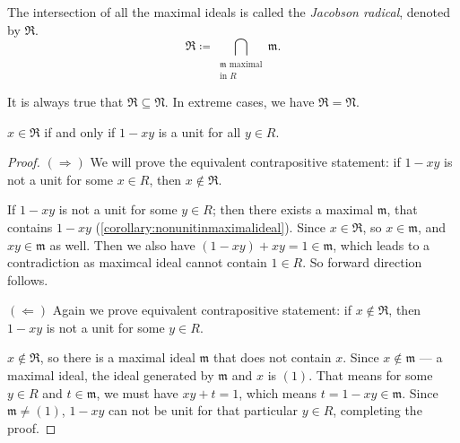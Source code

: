 \begin{definition}
    The intersection of all the maximal ideals is called the \textit{Jacobson radical}, denoted by \(\mathfrak{R}\).
    \[
        \mathfrak{R} \coloneq \bigcap_{\substack{\mathfrak{m} \text{ maximal} \\ \text{in } R}} \mathfrak{m}.
    \] 
\end{definition}
It is always true that \(\mathfrak{R} \subseteq \mathfrak{N}\). In extreme cases, we have \(\mathfrak{R} = \mathfrak{N}\).
\begin{theorem}\label{thm:characterisationOfJacobsonRad}
    \(x \in \mathfrak{R}\) if and only if \(1 - xy\) is a unit for all  \(y \in R\).
\end{theorem}
\begin{proof}
\((\Longrightarrow)\) We will prove the equivalent contrapositive statement: if \(1 - xy\) is not a unit for some  \(x \in R\), then  \(x \not\in \mathfrak{R}\).

If \(1 - xy\) is not a unit for some \(y \in R\); then there exists a maximal  \(\mathfrak{m}\), that contains \(1 - xy\) (\autoref{corollary:nonunitinmaximalideal}). Since  \(x \in \mathfrak{R}\), so \(x \in \mathfrak{m}\), and \(xy \in \mathfrak{m}\) as well. Then we also have \((1-xy)+xy  = 1\in \mathfrak{m}\), which leads to a contradiction as maximcal ideal cannot contain \(1 \in R\). So forward direction follows.

 \((\Longleftarrow)\) Again we prove equivalent contrapositive statement: if \(x \not\in  \mathfrak{R}\), then \(1-xy\) is not a unit for some  \(y \in R\).

\(x \not\in \mathfrak{\mathfrak{R}}\), so there is a maximal ideal \(\mathfrak{m}\) that does not contain \(x\). Since \(x \not\in \mathfrak{m}\) --- a maximal ideal, the ideal generated by \(\mathfrak{m}\) and \(x\) is \((1)\). That means for some \( y \in R \) and \( t \in \mathfrak{m} \), we must have \(xy + t = 1\), which means  \(t = 1 - xy \in \mathfrak{m}\). Since \(\mathfrak{m} \neq (1)\),  \(1 - xy\) can not be unit for that particular  \(y \in R\), completing the proof. 
\end{proof}
